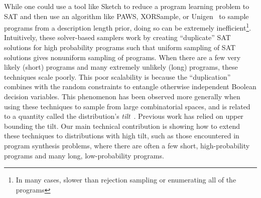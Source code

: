 \documentclass{article}
\begin{document}
While one could use a tool like Sketch to reduce a program learning problem to SAT
and then use an algorithm like PAWS, XORSample, or Unigen~\cite{ermon2013embed,gomes2006near,chakraborty2014balancing}
to sample programs from a description length prior,
doing so can be extremely inefficient\footnote{In many cases, slower than rejection sampling or enumerating all of the programs}.
Intuitively,
these solver-based samplers work by creating ``duplicate'' SAT solutions for high probability programs
such that uniform sampling of SAT solutions gives nonuniform sampling of programs.
When there are a few very likely (short) programs and many extremely unlikely (long) programs,
these techniques scale poorly. This poor scalability is because the ``duplication'' combines with the random constraints to entangle otherwise independent Boolean decision variables.
This phenomenon has been observed more generally when using these techniques to sample from large combinatorial spaces,
and is related to a quantity called the distribution's \emph{tilt}~\cite{chakraborty2014distribution}.
Previous work has relied on upper bounding the tilt.
Our main technical contribution is showing how to extend these techniques to distributions with high tilt,
such as those encountered in program synthesis problems,
where there are often a few short, high-probability programs and many long, low-probability programs.

 
\end{document}
